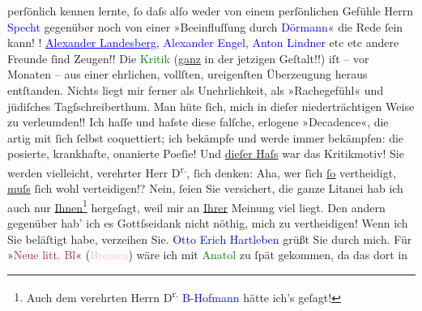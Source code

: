                     perſönlich kennen lernte, ſo daſs alſo weder von einem perſönlichen Gefühle {\pb}Herrn \textcolor{blue}{Specht}{}\ledrightnote{\textcolor{blue}{Richard Specht}} gegenüber noch von einer »Beeinfluſſung durch \textcolor{blue}{Dörmann}{}\ledrightnote{\textcolor{blue}{Felix Dörmann}}« die Rede ſein kann!\pend
           \pstart
           !\pend
           \pstart
           \textcolor{blue}{\uline{Alexander Landesberg}}{}\ledrightnote{\textcolor{blue}{Alexander Landesberg}}, \textcolor{blue}{Alexander Engel}{}\ledrightnote{\textcolor{blue}{Alexander Engel}}, \textcolor{blue}{Anton Lindner}{}\ledrightnote{\textcolor{blue}{Anton Lindner}} etc etc andere Freunde ſind Zeugen!!\pend
           \pstart
           Die \textcolor{green}{Kritik}{} (\uline{ganz} in der jetzigen Geſtalt!!) iſt – vor
                    Monaten – aus einer ehrlichen, vollſten, ureigenſten Überzeugung heraus
                    entſtanden. Nichts liegt mir ferner als Unehrlichkeit, als »Rachegefühl« und
                    jüdiſches Tagſschreiberthum. Man hüte ſich, mich in dieſer niederträchtigen
                    Weise zu verleumden!!\pend
           \pstart
           Ich haſſe und haſste diese falſche, erlogene »Decadence«, die artig mit ſich
                    ſelbst coquettiert; ich bekämpfe und werde immer bekämpfen: die posierte,
                    krankhafte, onanierte Poeſie! {\pb}Und
                        \uline{dieſer Haſs} war das Kritikmotiv!\pend
           \pstart
            Sie werden vielleicht, verehrter Herr
                        D\textsuperscript{r.}, ſich denken: Aha, wer ſich \uline{ſo} vertheidigt, \uline{muſs}{ }ſich wohl verteidigen!?  Nein, ſeien Sie versichert, die ganze Litanei
                    hab ich auch nur \uline{Ihnen}\footnote{\noindent{}Auch dem verehrten Herrn D\textsuperscript{r.}{ }\textcolor{blue}{B-Hofmann}{}\ledrightnote{\textcolor{blue}{Richard Beer-Hofmann}} hätte ich’s geſagt!} hergeſagt, weil mir an \uline{Ihrer} Meinung
                         viel liegt. Den andern gegenüber hab’
                    ich es Gottſseidank nicht nöthig, mich zu vertheidigen!\pend
           \pstart
           Wenn ich Sie beläſtigt habe, verzeihen Sie.\pend
           \pstart
           \textcolor{blue}{Otto Erich Hartleben}{}\ledrightnote{\textcolor{blue}{Otto Erich Hartleben}} grüßt Sie durch
                    mich.\pend
           \pstart
           Für »\textcolor{brown}{Neue litt. Bl}{}\ledrightnote{\textcolor{brown}{Neue litterarische Blätter}}« \introOben{}(\textcolor{pink}{Bremen}{}\ledrightnote{\textcolor{pink}{Bremen}})\introOben{} wäre ich mit \textcolor{green}{Anatol}{}\ledrightnote{\textcolor{green}{Anatol}} zu ſpät gekommen, da das dort in
